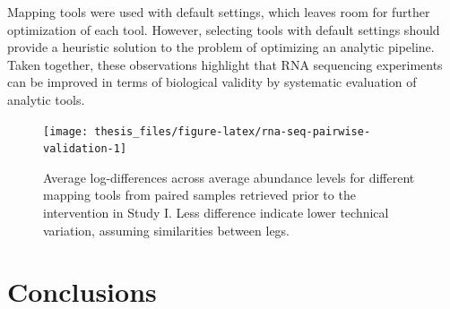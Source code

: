 \documentclass[twoside,10pt]{gihclass} %
\begin{document}
Mapping tools were used with default settings, which leaves room for further optimization of each tool. However, selecting tools with default settings should provide a heuristic solution to the problem of optimizing an analytic pipeline. Taken together, these observations highlight that RNA sequencing experiments can be improved in terms of biological validity by systematic evaluation of analytic tools.
\begin{figure}

{\centering \texttt{[image: thesis\_files/figure-latex/rna-seq-pairwise-validation-1]} 

}

\caption[Within-participant variation between RNA sequencing mapping tools.]{Average log-differences across average abundance levels for different mapping tools from paired samples retrieved prior to the intervention in Study I. Less difference indicate lower technical variation, assuming similarities between legs.}\label{fig:rna-seq-pairwise-validation}
\end{figure}
\hypertarget{conclusions}{%
\chapter{Conclusions}\label{conclusions}}
\end{document}
